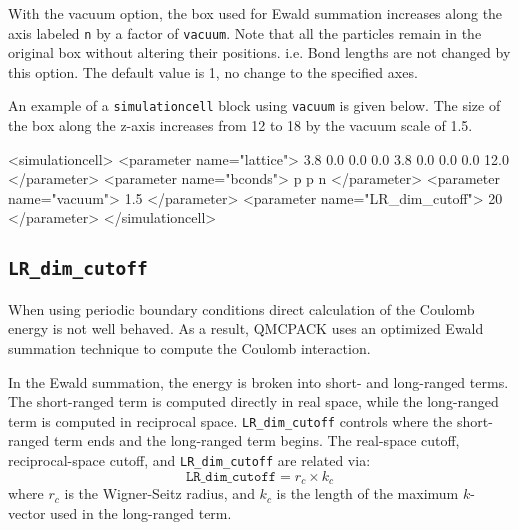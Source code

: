 With the vacuum option, the box used for Ewald summation increases along the axis labeled \texttt{n} by a factor of \texttt{vacuum}.
Note that all the particles remain in the original box without altering their positions. i.e. Bond lengths are not changed by this option.
The default value is 1, no change to the specified axes.

An example of a \texttt{simulationcell} block using \texttt{vacuum} is given below.
The size of the box along the z-axis increases from 12 to 18 by the vacuum scale of 1.5.
\begin{shade}
  <simulationcell>
    <parameter name="lattice">
      3.8       0.0       0.0
      0.0       3.8       0.0
      0.0       0.0      12.0
    </parameter>
    <parameter name="bconds">
       p p n
    </parameter>
    <parameter name="vacuum"> 1.5 </parameter>
    <parameter name="LR_dim_cutoff"> 20 </parameter>
  </simulationcell>
\end{shade}

\subsection{\texttt{LR\_dim\_cutoff}}
When using periodic boundary conditions direct calculation of the Coulomb energy is
not well behaved. As a result, QMCPACK uses an optimized Ewald summation technique
to compute the Coulomb interaction.\cite{Natoli1995}

In the Ewald summation, the energy is broken into short- and long-ranged terms.
The short-ranged term is computed directly in real space, while the long-ranged term is computed in reciprocal space.
\texttt{LR\_dim\_cutoff} controls where the short-ranged term ends and the long-ranged term begins.
The real-space cutoff, reciprocal-space cutoff, and \texttt{LR\_dim\_cutoff} are related via:
\[
\texttt{LR\_dim\_cutoff} = r_{c} \times k_{c}
\]
where $r_{c}$ is the Wigner-Seitz radius, and $k_{c}$ is the length of the maximum $k$-vector used in the long-ranged term.
